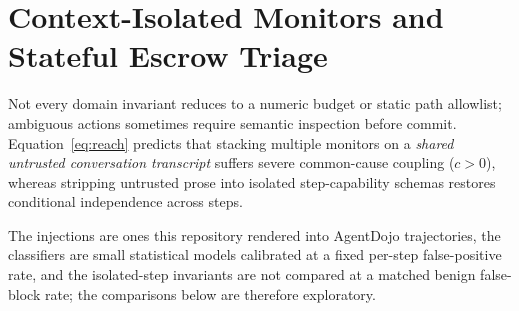 \section{Context-Isolated Monitors and Stateful Escrow Triage}\label{sec:monitors}

Not every domain invariant reduces to a numeric budget or static path allowlist; ambiguous actions sometimes require semantic inspection before commit. Equation~\eqref{eq:reach} predicts that stacking multiple monitors on a \emph{shared untrusted conversation transcript} suffers severe common-cause coupling (\(c > 0\)), whereas stripping untrusted prose into isolated step-capability schemas restores conditional independence across steps.



The injections are ones this repository rendered into AgentDojo trajectories, the classifiers are small statistical
models calibrated at a fixed per-step false-positive rate, and the isolated-step invariants are not compared at a
matched benign false-block rate; the comparisons below are therefore exploratory.

